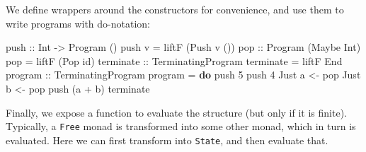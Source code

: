\documentclass[runningheads,plain]{llncs}
\newenvironment{Shaded}{}{}
\newcommand{\KeywordTok}[1]{\textcolor[rgb]{0.00,0.44,0.13}{\textbf{#1}}}
\newcommand{\DataTypeTok}[1]{\textcolor[rgb]{0.56,0.13,0.00}{#1}}
\newcommand{\DecValTok}[1]{\textcolor[rgb]{0.25,0.63,0.44}{#1}}
\newcommand{\OtherTok}[1]{\textcolor[rgb]{0.00,0.44,0.13}{#1}}
\newcommand{\FunctionTok}[1]{\textcolor[rgb]{0.02,0.16,0.49}{#1}}
\newcommand{\NormalTok}[1]{#1}
\begin{document}
We define wrappers around the constructors for convenience,
and use them to write programs with do-notation:
\begin{Shaded}
\begin{Highlighting}[]
\OtherTok{push ::} \DataTypeTok{Int} \OtherTok{->} \DataTypeTok{Program}\NormalTok{ ()}
\NormalTok{push v }\FunctionTok{=}\NormalTok{ liftF (}\DataTypeTok{Push}\NormalTok{ v ())   }
\OtherTok{pop ::} \DataTypeTok{Program}\NormalTok{ (}\DataTypeTok{Maybe} \DataTypeTok{Int}\NormalTok{) }
\NormalTok{pop }\FunctionTok{=}\NormalTok{ liftF (}\DataTypeTok{Pop}\NormalTok{ id)}
\OtherTok{terminate ::} \DataTypeTok{TerminatingProgram}  
\NormalTok{terminate }\FunctionTok{=}\NormalTok{ liftF }\DataTypeTok{End}
\OtherTok{program ::} \DataTypeTok{TerminatingProgram}  
\NormalTok{program }\FunctionTok{=} \KeywordTok{do}    
\NormalTok{    push }\DecValTok{5}  
\NormalTok{    push }\DecValTok{4}  
    \DataTypeTok{Just}\NormalTok{ a }\OtherTok{<-}\NormalTok{ pop    }
    \DataTypeTok{Just}\NormalTok{ b }\OtherTok{<-}\NormalTok{ pop    }
\NormalTok{    push (a }\FunctionTok{+}\NormalTok{ b)    }
\NormalTok{    terminate}
\end{Highlighting}
\end{Shaded}

Finally, we expose a function to evaluate the structure (but
only if it is finite). Typically, a \texttt{Free} monad is transformed
into some other monad, which in turn is evaluated. Here we can first transform into \texttt{State}, and then evaluate that.
\end{document}
